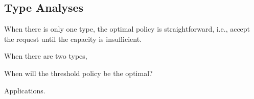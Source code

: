 







\subsection{Type Analyses}

When there is only one type, the optimal policy is straightforward, i.e., accept the request until the capacity is insufficient. 

When there are two types, 

When will the threshold policy be the optimal?

Applications.
